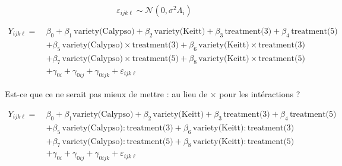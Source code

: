 \documentclass[a4paper, landscape, 11pt]{article}
\begin{document}
\[
\varepsilon_{ijk\ell} \sim \mathcal{N}\left( 0, \sigma^2\Lambda_i \right)
\]


\newpage

\begin{align*}
 Y_{ijk\ell} = \ &\beta_0 + \beta_1\, \text{variety(Calypso)} + \beta_{2}\, \text{variety(Keitt)} + \beta_{3}\, \text{treatment(3)} + \beta_4\, \text{treatment(5)}\\
 & + \beta_5\, \text{variety(Calypso)} \times \text{treatment(3)} + \beta_6\, \text{variety(Keitt)} \times \text{treatment(3)} \\
 & + \beta_7\, \text{variety(Calypso)} \times \text{treatment(5)} + \beta_8\, \text{variety(Keitt)} \times \text{treatment(5)} \\
 & + \gamma_{0i} + \gamma_{0ij} + \gamma_{0ijk} + \varepsilon_{ijk\ell}
\end{align*}

\vspace*{2cm}

Est-ce que ce ne serait pas mieux de mettre : au lieu de $\times$ pour les intéractions ?

\vspace*{1cm}

\begin{align*}
 Y_{ijk\ell} = \ &\beta_0 + \beta_1 \text{variety(Calypso)} + \beta_{2}\, \text{variety(Keitt)} + \beta_{3}\, \text{treatment(3)} + \beta_4\, \text{treatment(5)}\\
 & + \beta_5 \, \text{variety(Calypso)} \colon \! \text{treatment(3)} + \beta_6\, \text{variety(Keitt)} \colon \! \text{treatment(3)} \\
 & + \beta_7\, \text{variety(Calypso)} \colon \! \text{treatment(5)} + \beta_8\, \text{variety(Keitt)} \colon \! \text{treatment(5)} \\
 & + \gamma_{0i} + \gamma_{0ij} + \gamma_{0ijk} + \varepsilon_{ijk\ell}
\end{align*}
\end{document}
